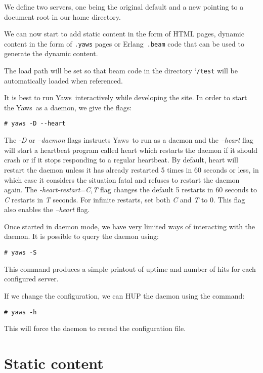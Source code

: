 \documentclass[11pt,oneside,english]{book}
\newcommand{\Erlang}            %
        {{\sc Erlang}}
\newcommand{\Yaws}            %
        {{\sc Yaws}}
\begin{document}
We define two servers, one being the original default
and a new pointing to a document root in our home directory.

We can now start to add static content in the form of HTML pages,
dynamic content in the form of \verb+.yaws+ pages or
\Erlang\ \verb+.beam+ code that can be used to generate the dynamic
content.

The load path will be set so that beam code in the directory
\char`\~\verb+/test+ will be automatically loaded when referenced.

It is best to run \Yaws\  interactively while developing the site.
In order to start the \Yaws\  as a daemon, we give the flags:
\begin{verbatim}
# yaws -D --heart
\end{verbatim}

The \textit{-D} or \textit{--daemon} flags instructs \Yaws\ to run as
a daemon and the \textit{--heart} flag will start a heartbeat program
called heart which restarts the daemon if it should crash or if it
stops responding to a regular heartbeat. By default, heart will
restart the daemon unless it has already restarted 5 times in 60
seconds or less, in which case it considers the situation fatal and
refuses to restart the daemon again. The \textit{-heart-restart=C,T}
flag changes the default 5 restarts in 60 seconds to \textit{C}
restarts in \textit{T} seconds. For infinite restarts, set both
\textit{C} and \textit{T} to 0. This flag also enables the
\textit{--heart} flag.

Once started in daemon mode, we have very limited ways of interacting
with the daemon. It is possible to query the daemon using:
\begin{verbatim}
# yaws -S
\end{verbatim}

This command produces a simple printout of uptime and number of hits
for each configured server.

If we change the configuration, we can HUP the daemon using the
command:
\begin{verbatim}
# yaws -h
\end{verbatim}

This will force the daemon to reread the configuration file.



\chapter{Static content}
\end{document}
